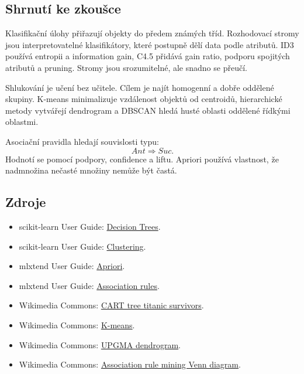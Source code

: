 \subsection{Shrnutí ke zkoušce}

Klasifikační úlohy přiřazují objekty do předem známých tříd. Rozhodovací stromy jsou interpretovatelné
klasifikátory, které postupně dělí data podle atributů. ID3 používá entropii a information gain, C4.5 přidává
gain ratio, podporu spojitých atributů a pruning. Stromy jsou srozumitelné, ale snadno se přeučí.

Shlukování je učení bez učitele. Cílem je najít homogenní a dobře oddělené skupiny. K-means minimalizuje
vzdálenost objektů od centroidů, hierarchické metody vytvářejí dendrogram a DBSCAN hledá husté oblasti
oddělené řídkými oblastmi.

Asociační pravidla hledají souvislosti typu:
\[
Ant \Rightarrow Suc.
\]
Hodnotí se pomocí podpory, confidence a liftu. Apriori používá vlastnost, že nadmnožina nečasté množiny
nemůže být častá.

\subsection{Zdroje}

\begin{itemize}
    \item scikit-learn User Guide:
    \href{https://scikit-learn.org/stable/modules/tree.html}{Decision Trees}.
    \item scikit-learn User Guide:
    \href{https://scikit-learn.org/stable/modules/clustering.html}{Clustering}.
    \item mlxtend User Guide:
    \href{https://rasbt.github.io/mlxtend/user\_guide/frequent\_patterns/apriori/}{Apriori}.
    \item mlxtend User Guide:
    \href{https://rasbt.github.io/mlxtend/user\_guide/frequent\_patterns/association\_rules/}{Association
    rules}.
    \item Wikimedia Commons:
    \href{https://commons.wikimedia.org/wiki/File:CART\_tree\_titanic\_survivors.png}{CART tree titanic
    survivors}.
    \item Wikimedia Commons:
    \href{https://commons.wikimedia.org/wiki/File:K-means.png}{K-means}.
    \item Wikimedia Commons:
    \href{https://commons.wikimedia.org/wiki/File:UPGMA\_Dendrogram\_Hierarchical.svg}{UPGMA dendrogram}.
    \item Wikimedia Commons:
    \href{https://commons.wikimedia.org/wiki/File:Association\_Rule\_Mining\_Venn\_Diagram.png}{Association
    rule mining Venn diagram}.
\end{itemize}

\newpage
